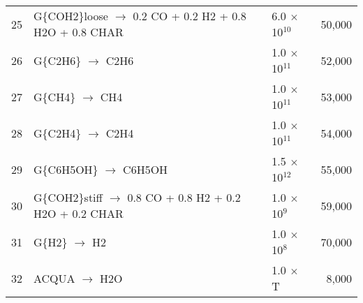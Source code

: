\begin{center}
\begin{longtable}{cp{4in}lr}
        25 & G\{COH2\}loose $\rightarrow$ 0.2 CO + 0.2 H2 + 0.8 H2O + 0.8 CHAR & 6.0 $\times$ 10$^{10}$ & 50,000 \\
        26 & G\{C2H6\} $\rightarrow$ C2H6 & 1.0 $\times$ 10$^{11}$ & 52,000 \\
        27 & G\{CH4\} $\rightarrow$ CH4 & 1.0 $\times$ 10$^{11}$ & 53,000 \\
        28 & G\{C2H4\} $\rightarrow$ C2H4 & 1.0 $\times$ 10$^{11}$ & 54,000 \\
        29 & G\{C6H5OH\} $\rightarrow$ C6H5OH & 1.5 $\times$ 10$^{12}$ & 55,000 \\
        30 & G\{COH2\}stiff $\rightarrow$ 0.8 CO + 0.8 H2 + 0.2 H2O + 0.2 CHAR & 1.0 $\times$ 10$^9$ & 59,000 \\
        31 & G\{H2\} $\rightarrow$ H2 & 1.0 $\times$ 10$^8$ & 70,000 \\
        32 & ACQUA $\rightarrow$ H2O & 1.0 $\times$ T & 8,000 \\
        \bottomrule
    \end{longtable}
\end{center}


